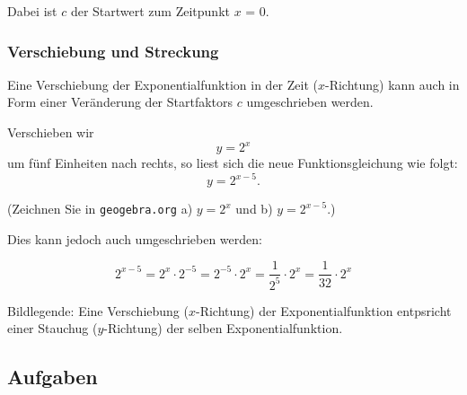 \begin{center}\end{center}

Dabei ist $c$ der Startwert zum Zeitpunkt $x$ = 0.

\newpage



\subsubsection{Verschiebung und Streckung}

Eine Verschiebung der Exponentialfunktion in der Zeit ($x$-Richtung) kann auch in Form einer Veränderung der Startfaktors $c$ umgeschrieben werden.

Verschieben wir \zB $$y=2^x$$ um fünf Einheiten nach rechts, so liest sich die neue Funktionsgleichung wie folgt:
$$y=2^{x-5}.$$

(Zeichnen Sie in \texttt{geogebra.org} a) $y=2^x$ und b) $y=2^{x-5}$.)

Dies kann jedoch auch umgeschrieben werden:

$$2^{x-5} = 2^x \cdot{} 2^{-5} = 2^{-5} \cdot{} 2^x = \frac{1}{2^5} \cdot{} 2^x =
\frac{1}{32}\cdot{}2^x$$

Bildlegende: Eine Verschiebung ($x$-Richtung) der Exponentialfunktion entpsricht einer Stauchug ($y$-Richtung) der selben Exponentialfunktion.



\subsection*{Aufgaben}
\newpage
